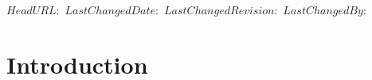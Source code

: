 \svnidlong
{$HeadURL:  $}
{$LastChangedDate:  $}
{$LastChangedRevision:  $}
{$LastChangedBy:  $}
\chapter[Introduction]{Introduction\versionfootnote}
\label{cha:introduction}




